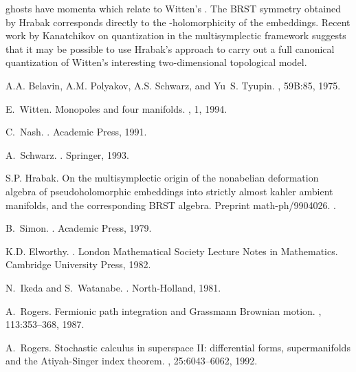 \documentclass[a4paper,fleqn,12pt]{article}
\begin{document}
ghosts have momenta \coordHE{} which relate to
Witten's \myHighlight{$\pi^{\alpha}_{\mu}$}\coordHE{}. The BRST symmetry obtained by
Hrabak corresponds directly to the \coordHE{}-holomorphicity of the
embeddings. Recent work by Kanatchikov \cite{Kanatc} on
quantization in the multisymplectic framework suggests that it may
be possible to use Hrabak's approach to carry out a full canonical
quantization of Witten's interesting two-dimensional topological
model.
\begin{thebibliography}{9}

A.A. Belavin, A.M. Polyakov, A.S. Schwarz, and Yu~S. Tyupin.
, 59B:85, 1975.

E.~Witten.
\newblock Monopoles and four manifolds.
, 1, 1994.

C.~Nash.
.
\newblock Academic Press, 1991.

A.~Schwarz.
.
\newblock Springer, 1993.

S.P. Hrabak.
\newblock On the multisymplectic origin of the nonabelian deformation algebra
  of pseudoholomorphic embeddings into strictly almost kahler ambient
  manifolds, and the corresponding {BRST} algebra.
  \newblock Preprint math-ph/9904026.
.

B.~Simon.
.
\newblock Academic Press, 1979.

K.D. Elworthy.
.
\newblock London Mathematical Society Lecture Notes in Mathematics. Cambridge
  University Press, 1982.

N.~Ikeda and S.~Watanabe.
.
\newblock North-Holland, 1981.

A.~Rogers.
\newblock Fermionic path integration and {G}rassmann {B}rownian motion.
, 113:353--368, 1987.

A.~Rogers.
\newblock Stochastic calculus in superspace {II}: differential forms,
  supermanifolds and the {A}tiyah-{S}inger index theorem.
, 25:6043--6062, 1992.


\end{thebibliography}
\end{document}
